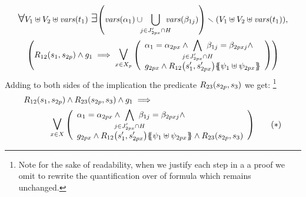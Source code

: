 \documentclass[runningheads]{llncs}
\begin{document}
\begin{enumerate}
\begin{multline*}
\bigforall V_1 \uplus V_2 \uplus \fvars{t_1}\,\,
\bigexists \mpar{\fvars{\alpha_{1}}  \cup
\!\!\! \bigcup_{j \in J'_{2px} \cap H}\!\!\!\!\!\fvars{\beta_{1j}}} \setminus \mpar{V_1 \uplus V_2 \uplus \fvars{t_1}}, \\ \mpar{R_{12}\mpar{s_1, s_{2p}} \wedge g_1 \implies \operatorname*{\bigsymb{\bigvee}}_{x \in X_p} \mpar{\everymath{\displaystyle}
\begin{array}{l}
			\alpha_1 = \alpha_{2px} \wedge \bigwedge_\subbox{j \in J'_{2px} \cap H} \beta_{1j} = \beta_{2pxj} \nwedge\\
			 g_{2px} \wedge R_{12}\mpar{s'_1, s'_{2px}}\psubst{\psi_1 \uplus \psi_{2px}}
		\end{array}}} \\
	\end{multline*}	
\medskip
Adding to both sides of the implication the predicate $R_{23}{\left(s_{2p},s_3\right)}$ we get: \footnote{Note for the sake of readability, when we justify each step in a a proof
we omit to rewrite the quantification over of formula which remains unchanged.}
\begin{align*}
R_{12}\mpar{s_1, s_{2p}} \wedge R_{23}\mpar{s_{2p},s_3} \wedge g_1 \implies\hspace{5.5cm}\\ \operatorname*{\bigsymb{\bigvee}}_{x \in X} \mpar{\everymath{\displaystyle}
\begin{array}{l}
			\alpha_1 = \alpha_{2px} \wedge \bigwedge_\subbox{j \in J'_{2px} \cap H} \beta_{1j} = \beta_{2pxj} \land\\
			 g_{2px} \wedge R_{12}\mpar{s'_1, s'_{2px}}\psubst{\psi_1 \uplus \psi_{2px}} \land R_{23}\mpar{s_{2p},s_3}
		\end{array}} \qquad (*) \\
\end{align*}		



\end{enumerate}
\end{document}
